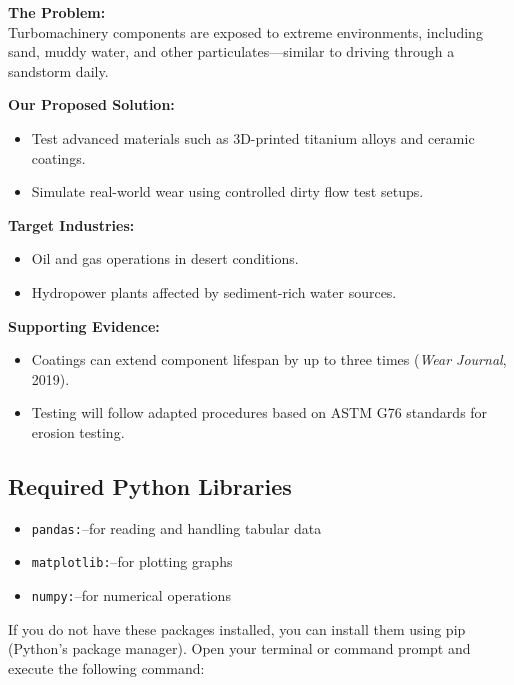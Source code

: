 \documentclass[12pt,a4paper]{article}
\begin{document}
\textbf{The Problem:} \\
Turbomachinery components are exposed to extreme environments, including sand, muddy water, and other particulates—similar to driving through a sandstorm daily.

\vspace{0.5em}

\textbf{Our Proposed Solution:}
\begin{itemize}
    \item Test advanced materials such as 3D-printed titanium alloys and ceramic coatings.
    \item Simulate real-world wear using controlled dirty flow test setups.
\end{itemize}

\vspace{0.5em}

\textbf{Target Industries:}
\begin{itemize}
    \item Oil and gas operations in desert conditions.
    \item Hydropower plants affected by sediment-rich water sources.
\end{itemize}

\vspace{0.5em}

\textbf{Supporting Evidence:}
\begin{itemize}
    \item Coatings can extend component lifespan by up to three times (\textit{Wear Journal}, 2019).
    \item Testing will follow adapted procedures based on ASTM G76 standards for erosion testing.
\end{itemize}









\subsection*{Required Python Libraries}
\begin{itemize}

    \item \texttt{pandas:}--for reading and handling tabular data
    \item \texttt{matplotlib:}--for plotting graphs
    \item \texttt{numpy:}--for numerical operations
    
\end{itemize}
 If you do not have these packages installed, you can install them using pip (Python’s package
 manager). Open your terminal or command prompt and execute the following command:
 
\end{document}
